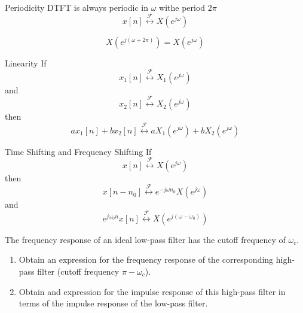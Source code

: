 \begin{frame}{Periodicity}
    DTFT is always periodic in $\omega$ withe period $2\pi$
    \begin{equation*}
        x[n] \overset{\mathcal{F}}{\leftrightarrow} X(e^{j\omega})
    \end{equation*}

    \begin{equation*}
        X\left(e^{j(\omega+2\pi)}\right) = X(e^{j\omega})
    \end{equation*}
\end{frame}

\begin{frame}{Linearity}
    If
    \begin{equation*}
        x_1[n] \overset{\mathcal{F}}{\leftrightarrow} X_1(e^{j\omega})
    \end{equation*}
    and
    \begin{equation*}
        x_2[n] \overset{\mathcal{F}}{\leftrightarrow} X_2(e^{j\omega})
    \end{equation*}
    then
    \begin{equation*}
        ax_1[n] + bx_2[n] \overset{\mathcal{F}}{\leftrightarrow} aX_1(e^{j\omega}) + bX_2(e^{j\omega})
    \end{equation*}
\end{frame}

\begin{frame}{Time Shifting and Frequency Shifting}
    If
    \begin{equation*}
        x[n] \overset{\mathcal{F}}{\leftrightarrow} X(e^{j\omega})
    \end{equation*}
    then
    \begin{equation*}
        x[n-n_0] \overset{\mathcal{F}}{\leftrightarrow} e^{-j\omega n_0}X(e^{j\omega})
    \end{equation*}
    and
    \begin{equation*}
        e^{j\omega_0 n}x[n] \overset{\mathcal{F}}{\leftrightarrow} X\left(e^{j(\omega - \omega_0)}\right)
    \end{equation*}
\end{frame}



\begin{frame}
    \begin{example}
        The frequency response of an ideal low-pass filter has the cutoff frequency of $\omega_c$.
        \begin{enumerate}
            \item Obtain an expression for the frequency response of the corresponding high-pass filter (cutoff frequency $\pi - \omega_c$).
            \item Obtain and expression for the impulse response of this high-pass filter in terms of the impulse response of the low-pass filter.
        \end{enumerate}
     \end{example}
\end{frame}



